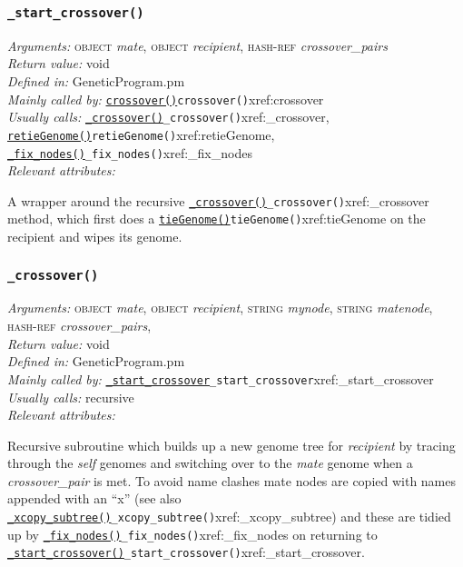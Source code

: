 \documentclass[a4paper]{article}
\begin{document}
\subsubsection{\texttt{\_start\_crossover()}}\label{xref:_start_crossover}
\begin{flushleft}
\textit{Arguments:} \textsc{object} \textit{mate}, \textsc{object} \textit{recipient}, \textsc{hash-ref} \textit{crossover\_pairs}\\
\textit{Return value:} void\\
\textit{Defined in:} GeneticProgram.pm\\
\textit{Mainly called by:} \hyperref[no]{\texttt{crossover()}}{\texttt{crossover()}}{xref:crossover}\\
\textit{Usually calls:} \hyperref[no]{\texttt{\_crossover()}}{\texttt{\_crossover()}}{xref:_crossover}, \hyperref[no]{\texttt{retieGenome()}}{\texttt{retieGenome()}}{xref:retieGenome}, \hyperref[no]{\texttt{\_fix\_nodes()}}{\texttt{\_fix\_nodes()}}{xref:_fix_nodes}\\
\textit{Relevant attributes:}
\end{flushleft}

A wrapper around the recursive \hyperref[no]{\texttt{\_crossover()}}{\texttt{\_crossover()}}{xref:_crossover} method, which first does a \hyperref[no]{\texttt{tieGenome()}}{\texttt{tieGenome()}}{xref:tieGenome} on the recipient and wipes its genome.

\subsubsection{\texttt{\_crossover()}}\label{xref:_crossover}
\begin{flushleft}
\textit{Arguments:} \textsc{object} \textit{mate}, \textsc{object} \textit{recipient}, \textsc{string} \textit{mynode}, \textsc{string} \textit{matenode}, \textsc{hash-ref} \textit{crossover\_pairs}, \\
\textit{Return value:} void\\
\textit{Defined in:} GeneticProgram.pm\\
\textit{Mainly called by:} \hyperref[no]{\texttt{\_start\_crossover}}{\texttt{\_start\_crossover}}{xref:_start_crossover} \\
\textit{Usually calls:} recursive\\
\textit{Relevant attributes:}
\end{flushleft}

Recursive subroutine which builds up a new genome tree for
\textit{recipient} by tracing through the \textit{self} genomes and
switching over to the \textit{mate} genome when a
\textit{crossover\_pair} is met.  To avoid name clashes mate nodes are
copied with names appended with an ``x'' (see also \hyperref[no]{\texttt{\_xcopy\_subtree()}}{\texttt{\_xcopy\_subtree()}}{xref:_xcopy_subtree}) and these are tidied up by
\hyperref[no]{\texttt{\_fix\_nodes()}}{\texttt{\_fix\_nodes()}}{xref:_fix_nodes} on returning to \hyperref[no]{\texttt{\_start\_crossover()}}{\texttt{\_start\_crossover()}}{xref:_start_crossover}.
\end{document}
